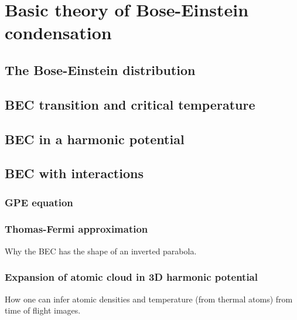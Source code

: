 
\renewcommand{\thechapter}{2}

\chapter{Basic theory of Bose-Einstein condensation}

\section{The Bose-Einstein distribution}
\section{BEC transition and critical temperature}
\section{BEC in a harmonic potential}
\section{BEC with interactions}
\subsection{GPE equation}
\subsection{Thomas-Fermi approximation}
Why the BEC has the shape of an inverted parabola. 
\subsection{Expansion of atomic cloud in 3D harmonic potential}
How one can infer atomic densities and temperature (from thermal atoms) from time of flight images.






